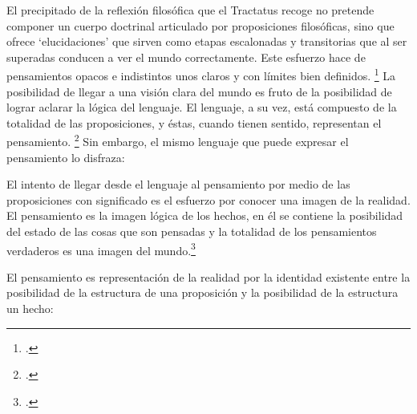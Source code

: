 El precipitado de la reflexión filosófica que el Tractatus recoge no pretende
componer un cuerpo doctrinal articulado por proposiciones filosóficas, sino que
ofrece `elucidaciones' que sirven como etapas escalonadas y transitorias que al
ser superadas conducen a ver el mundo correctamente. Este esfuerzo hace de
pensamientos opacos e indistintos unos claros y con límites bien definidos.
\footcite[cf. 4.112 y 6.54]{tractatus} La posibilidad de llegar a una visión
clara del mundo es fruto de la posibilidad de lograr aclarar la lógica del
lenguaje. El lenguaje, a su vez, está compuesto de la totalidad de las
proposiciones, y éstas, cuando tienen sentido, representan el pensamiento.
\footcite[cf. 4 y 4.001]{tractatus} Sin embargo, el mismo lenguaje que puede
expresar el pensamiento lo disfraza:


El intento de llegar desde el lenguaje al pensamiento por medio de las
proposiciones con significado es el esfuerzo por conocer una imagen de la
realidad. El pensamiento es la imagen lógica de los hechos, en él se contiene la
posibilidad del estado de las cosas que son pensadas y la totalidad de los
pensamientos verdaderos es una imagen del mundo.\footcite[cf.][3 y
3.001]{tractatus}


El pensamiento es representación de la realidad por la identidad existente entre
la posibilidad de la estructura de una proposición y la posibilidad de la
estructura un hecho:

